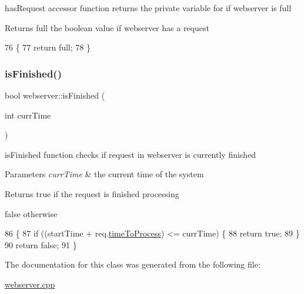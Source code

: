 has\+Request accessor function returns the private variable for if webserver is full \begin{DoxyReturn}{Returns}
full the boolean value if webserver has a request 
\end{DoxyReturn}

\begin{DoxyCode}
76                           \{
77             \textcolor{keywordflow}{return} full;
78         \}
\end{DoxyCode}
\mbox{\label{classwebserver_ab0d202209647832942f60806dd3835ef}} 
\subsubsection{\texorpdfstring{is\+Finished()}{isFinished()}}
{\footnotesize\ttfamily bool webserver\+::is\+Finished (\begin{DoxyParamCaption}\item[{int}]{curr\+Time }\end{DoxyParamCaption})\hspace{0.3cm}{\ttfamily [inline]}}

is\+Finished function checks if request in webserver is currently finished 
\begin{DoxyParams}{Parameters}
{\em curr\+Time} & the current time of the system \\
\hline
\end{DoxyParams}
\begin{DoxyReturn}{Returns}
true if the request is finished processing 

false otherwise 
\end{DoxyReturn}

\begin{DoxyCode}
86                                       \{
87             \textcolor{keywordflow}{if} ((startTime + req.\hyperlink{structrequest_aab0c9ef2df6d6c10f057a0066908cce2}{timeToProcess}) <= currTime) \{
88                 \textcolor{keywordflow}{return} \textcolor{keyword}{true};
89             \}
90             \textcolor{keywordflow}{return} \textcolor{keyword}{false};
91         \}
\end{DoxyCode}


The documentation for this class was generated from the following file\+:\begin{DoxyCompactItemize}
\item 
\hyperlink{webserver_8cpp}{webserver.\+cpp}\end{DoxyCompactItemize}
